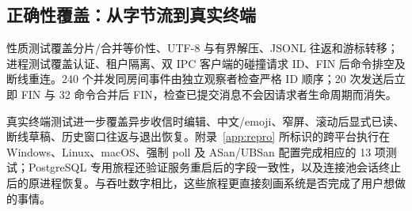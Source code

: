 \subsection{正确性覆盖：从字节流到真实终端}
\label{sec:validation}
性质测试覆盖分片/合并等价性、UTF-8 与有界解压、JSONL 往返和游标转移；进程测试覆盖认证、租户隔离、双 IPC 客户端的碰撞请求 ID、FIN 后命令排空及断线重连。240 个并发同房间事件由独立观察者检查严格 ID 顺序；20 次发送后立即 FIN 与 32 命令合并后 FIN，检查已提交消息不会因请求者生命周期而消失。

真实终端测试进一步覆盖异步收信时编辑、中文/emoji、窄屏、滚动后显式已读、断线草稿、历史窗口往返与退出恢复。附录~\ref{app:repro} 所标识的跨平台执行在 Windows、Linux、macOS、强制 poll 及 ASan/UBSan 配置完成相应的 13 项测试；PostgreSQL 专用旅程还验证服务重启后的字段一致性，以及连接池会话终止后的原进程恢复。与吞吐数字相比，这些旅程更直接刻画系统是否完成了用户想做的事情。
